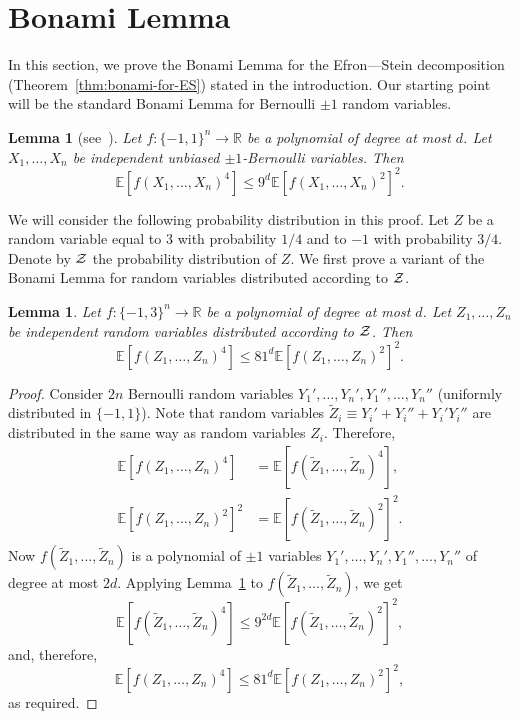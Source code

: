 \documentclass[11pt]{article}
\newcommand {\Exp}       {\mathbb{E}}
\newcommand {\E}     [1] {\Exp\left[#1\right]}
\newtheorem{lemma}[theorem]{Lemma}
\begin{document}
\section{Bonami Lemma} \label{sec:Bonami}
In this section, we prove the Bonami Lemma for the Efron---Stein decomposition (Theorem~\ref{thm:bonami-for-ES}) stated in the introduction.
Our starting point will be the standard Bonami Lemma for Bernoulli $\pm 1$ random variables.
\begin{lemma}[see~\cite{Bonami, ODonnell}]\label{lem:bonami-standard}
Let $f:\{-1,1\}^n \to {\mathbb R}$ be a polynomial of degree at most $d$. Let $X_1,\dots, X_n$ be independent
unbiased $\pm 1$-Bernoulli variables. Then
$$\E{f(X_1,\dots,X_n)^4} \leq 9^{d} \E{f(X_1,\dots,X_n)^2}^2.$$
\end{lemma}

We will consider the following probability distribution in this proof. Let $Z$ be a random variable equal to 3 with probability $1/4$
and to $-1$ with probability $3/4$. Denote by $\cal Z$ the probability distribution of $Z$.
We first prove a variant of the Bonami Lemma for random variables distributed according to $\cal Z$.
\begin{lemma}\label{lem:bonami-Z}
Let $f:\{-1,3\}^n \to {\mathbb R}$ be a polynomial of degree at most $d$. Let $Z_1,\dots, Z_n$ be independent random variables
distributed according to $\cal Z$. Then
$$\E{f(Z_1,\dots, Z_n)^4} \leq 81^{d} \E{f(Z_1,\dots, Z_n)^2}^2.$$
\end{lemma}
\begin{proof}
Consider $2n$ Bernoulli random variables $Y_1',\dots, Y_{n}',Y_1'',\dots, Y_n''$ (uniformly distributed in $\{-1,1\}$).
Note that random variables $\tilde Z_i \equiv Y_i' + Y_i'' + Y_i' Y_i''$ are distributed in the same way as random variables $Z_i$. Therefore,
\begin{align*}
\E{f(Z_1,\dots, Z_n)^4} &= \E{f(\tilde Z_1,\dots, \tilde Z_n)^4},\\
\E{f(Z_1,\dots, Z_n)^2}^2 &= \E{f(\tilde Z_1,\dots, \tilde Z_n)^2}^2.
\end{align*}
Now $f(\tilde Z_1,\dots, \tilde Z_n)$ is a polynomial of $\pm 1$ variables $Y_1',\dots, Y_{n}',Y_1'',\dots, Y_n''$ of degree at most $2d$.
Applying Lemma~\ref{lem:bonami-standard} to $f(\tilde Z_1,\dots, \tilde Z_n)$, we get
$$\E{f(\tilde Z_1,\dots, \tilde Z_n)^4} \leq 9^{2d} \E{f(\tilde Z_1,\dots, \tilde Z_n)^2}^2,$$
and, therefore,
$$\E{f(Z_1,\dots, Z_n)^4} \leq 81^d \E{f(Z_1,\dots, Z_n)^2}^2,$$
as required.
\end{proof}
\end{document}
